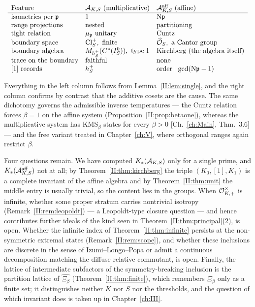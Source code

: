 \[
\begin{array}{lll}
\text{Feature} & \cA_{K,S}\ (\text{multiplicative}) & \cA^{\mathrm{aff}}_{K,S}\ (\text{affine})\\\hline
\text{isometries per }\pp & 1 & \Ns\pp\\
\text{range projections} & \text{nested} & \text{partitioning}\\
\text{tight relation} & \mu_\pp\ \text{unitary} & \text{Cuntz}\\
\text{boundary space} & \Cl^+_S,\ \text{finite} & \hO_S,\ \text{a Cantor group}\\
\text{boundary algebra} & M_{h^+_S}(C^*(I_S^0)),\ \text{type }\mathrm I & \text{Kirchberg (the algebra itself)}\\
\text{trace on the boundary} & \text{faithful} & \text{none}\\
{[1]}\ \text{records} & h^+_S & \text{order}\mid\gcd(\Ns\pp-1)
\end{array}
\]

Everything in the left column follows from Lemma~\ref{II:lem:single}, and the right column
confirms by contrast that the additive cosets are the cause. The same dichotomy governs the
admissible inverse temperatures --- the Cuntz relation forces $\beta=1$ on the affine
system (Proposition~\ref{II:prop:betaone}), whereas the multiplicative system has
$\mathrm{KMS}_\beta$ states for every $\beta>0$ [Ch.~\ref{ch:Main}, Thm.~3.6] --- and the free
variant treated in Chapter~\ref{ch:V}, where orthogonal ranges again restrict $\beta$.

Four questions remain. We have computed $K_*(\mathcal{A}_{K,S})$ only for a single prime, and
$K_*(\mathcal{A}^{\mathrm{aff}}_{K,S})$ not at all; by Theorem~\ref{II:thm:kirchberg} the triple
$(K_0,[1],K_1)$ is a complete invariant of the affine algebra and by Theorem~\ref{II:thm:unit}
the middle entry is usually trivial, so the content lies in the groups. When
$\mathcal{O}^\times_{K,+}$ is infinite, whether some proper stratum carries nontrivial isotropy
(Remark~\ref{II:rem:leopoldt}) --- a Leopoldt-type closure question --- and hence contributes
further ideals of the kind seen in Theorem~\ref{II:thm:principal}(2), is open. Whether the
infinite index of Theorem~\ref{II:thm:infinite} persists at the non-symmetric extremal states
(Remark~\ref{II:rem:scope}), and whether these inclusions are discrete in the sense of
Izumi--Longo--Popa \cite{ILP} or admit a continuous decomposition matching the diffuse
relative commutant, is open. Finally, the lattice of intermediate subfactors
\cite{Watatani} of the symmetry-breaking inclusion is the partition lattice of
$\widehat{\Xi_\beta}$ (Theorem~\ref{II:thm:finite}), which remembers $\Xi_\beta$ only as a finite
set; it distinguishes neither $K$ nor $S$ nor the thresholds, and the question of which
invariant does is taken up in Chapter~\ref{ch:III}.

